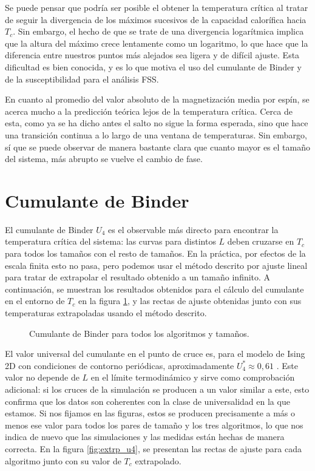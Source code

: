 Se puede pensar que podría ser posible el obtener la temperatura crítica al tratar de seguir la divergencia de los máximos sucesivos de la capacidad calorífica hacia $T_c$. Sin embargo, el hecho de que se trate de una divergencia logarítmica implica que la altura del máximo crece lentamente como un logaritmo, lo que hace que la diferencia entre nuestros puntos más alejados sea ligera y de difícil ajuste. Esta dificultad es bien conocida, y es lo que motiva el uso del cumulante de Binder y de la susceptibilidad para el análisis FSS.

En cuanto al promedio del valor absoluto de la magnetización media por espín, se acerca mucho a la predicción teórica lejos de la temperatura crítica. Cerca de esta, como ya se ha dicho antes el salto no sigue la forma esperada, sino que hace una transición continua a lo largo de una ventana de temperaturas. Sin embargo, sí que se puede observar de manera bastante clara que cuanto mayor es el tamaño del sistema, más abrupto se vuelve el cambio de fase.

\section{Cumulante de Binder}

El cumulante de Binder $U_4$ es el observable más directo para encontrar la temperatura crítica del sistema: las curvas para distintos $L$ deben cruzarse en $T_c$ para todos los tamaños con el resto de tamaños. En la práctica, por efectos de la escala finita esto no pasa, pero podemos usar el método descrito por ajuste lineal para tratar de extrapolar el resultado obtenido a un tamaño infinito. A continuación, se muestran los resultados obtenidos para el cálculo del cumulante en el entorno de $T_c$ en la figura \ref{fig:u4}, y las rectas de ajuste obtenidas junto con sus temperaturas extrapoladas usando el método descrito.

\begin{figure}
  \centering
    
    \caption{Cumulante de Binder para todos los algoritmos y tamaños.}
    \label{fig:u4}
\end{figure}

El valor universal del cumulante en el punto de cruce es, para el modelo de Ising 2D con condiciones de contorno periódicas, aproximadamente $U_4^* \approx 0{,}61$ \citep{Binder1981}. Este valor no depende de $L$ en el límite termodinámico y sirve como comprobación adicional: si los cruces de la simulación se producen a un valor similar a este, esto confirma que los datos son coherentes con la clase de universalidad en la que estamos. Si nos fijamos en las figuras, estos se producen precisamente a más o menos ese valor para todos los pares de tamaño y los tres algoritmos, lo que nos indica de nuevo que las simulaciones y las medidas están hechas de manera correcta. En la figura \ref{fig:extrp_u4}, se presentan las rectas de ajuste para cada algoritmo junto con su valor de $T_c$ extrapolado.

